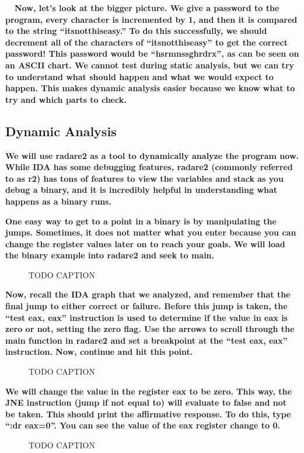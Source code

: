 \documentclass[letterpaper]{article}
\newcommand{\sitfig}[3]{
\begin{figure}[H]
\centering
\makebox[\textwidth][c]{
#2
}
\caption{#3}
\label{#1}
\end{figure}
}
\newcommand{\sitgfx}[4][scale=1.0]{
\sitfig{#3}{\texttt{[image: \#2]}}{#4}
}
\begin{document}
\textbf{ \ \ Now, let's look at the bigger picture. We give a password to the program, every character is incremented by
1, and then it is compared to the string ``itsnotthiseasy.'' To do this successfully, we should decrement all of the
characters of ``itsnotthiseasy'' to get the correct password! This password would be
``hsrmnssghrd{\textasciigrave}rx'', as can be seen on an ASCII chart. We cannot test during static analysis, but we can
try to understand what should happen and what we would expect to happen. This makes dynamic analysis easier because we
know what to try and which parts to check.}

\subsection{Dynamic Analysis}

\textbf{We will use radare2 as a tool to dynamically analyze the program now. While IDA has some debugging features,
radare2 (commonly referred to as r2) has tons of features to view the variables and stack as you debug a binary, and it
is incredibly helpful in understanding what happens as a binary runs.}

\textbf{One easy way to get to a point in a binary is by manipulating the jumps. Sometimes, it does not matter what you
enter because you can change the register values later on to reach your goals. We will load the binary example into
radare2 and seek to main.}

  
\sitgfx[width=6.5in,height=4.0626in]{FINALWORKINGDOCFORMERLYPRECURSOR-img053.png}{fig:unk}{TODO CAPTION}
 \textbf{Now, recall the IDA graph that we analyzed, and remember that the final jump to either correct or failure.
Before this jump is taken, the ``test eax, eax'' instruction is used to determine if the value in eax is zero or not,
setting the zero flag. Use the arrows to scroll through the main function in radare2 and set a breakpoint at the ``test
eax, eax'' instruction. Now, continue and hit this point.}

  
\sitgfx[width=6.5in,height=4.0626in]{FINALWORKINGDOCFORMERLYPRECURSOR-img054.png}{fig:unk}{TODO CAPTION}
 \textbf{We will change the value in the register eax to be zero. This way, the JNE instruction (jump if not equal to)
will evaluate to false and not be taken. This should print the affirmative response. To do this, type ``:dr eax=0''.
You can see the value of the eax register change to 0. }  
\sitgfx[width=6.5in,height=4.0626in]{FINALWORKINGDOCFORMERLYPRECURSOR-img055.png}{fig:unk}{TODO CAPTION}
 
\end{document}
